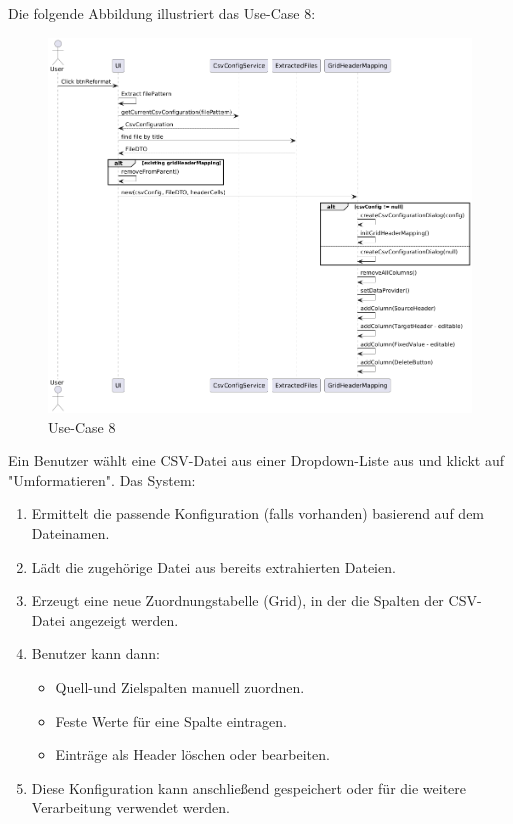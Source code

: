 \documentclass[a4paper,12pt]{scrreprt}
\begin{document}
Die folgende Abbildung illustriert das Use-Case 8:
\begin{figure}[H]
	\includegraphics[width=18.5cm]{CsvKonfiguration.png}
	\caption{\label{} Use-Case 8}
\end{figure}
Ein Benutzer wählt eine CSV-Datei aus einer Dropdown-Liste aus und klickt auf "Umformatieren". Das System:
\begin{enumerate}
	\item Ermittelt die passende Konfiguration (falls vorhanden) basierend auf dem Dateinamen.
	\item Lädt die zugehörige Datei aus bereits extrahierten Dateien.
	\item Erzeugt eine neue Zuordnungstabelle (Grid), in der die Spalten der CSV-Datei angezeigt werden.
	\item Benutzer kann dann:
		\begin{itemize}
			\item Quell-und Zielspalten manuell zuordnen.
			\item Feste Werte für eine Spalte eintragen.
			\item Einträge als Header löschen oder bearbeiten.
		\end{itemize}
	\item Diese Konfiguration kann anschließend gespeichert oder für die weitere Verarbeitung verwendet werden.
\end{enumerate}
\end{document}
